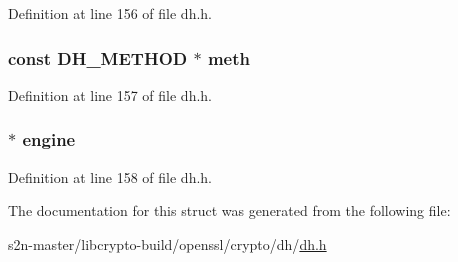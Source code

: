 Definition at line 156 of file dh.\+h.

\subsubsection[{\texorpdfstring{meth}{meth}}]{\setlength{\rightskip}{0pt plus 5cm}const {\bf D\+H\+\_\+\+M\+E\+T\+H\+OD} $\ast$ meth}\hypertarget{structdh__st_a835ecfca8492f404b4c94f6ecf02d7e4}{}\label{structdh__st_a835ecfca8492f404b4c94f6ecf02d7e4}


Definition at line 157 of file dh.\+h.

\subsubsection[{\texorpdfstring{engine}{engine}}]{ $\ast$ engine}\hypertarget{structdh__st_ae4bca26806adfdaf8a28463c98ddf03a}{}\label{structdh__st_ae4bca26806adfdaf8a28463c98ddf03a}


Definition at line 158 of file dh.\+h.



The documentation for this struct was generated from the following file\+:\begin{DoxyCompactItemize}
\item 
s2n-\/master/libcrypto-\/build/openssl/crypto/dh/\hyperlink{crypto_2dh_2dh_8h}{dh.\+h}\end{DoxyCompactItemize}
